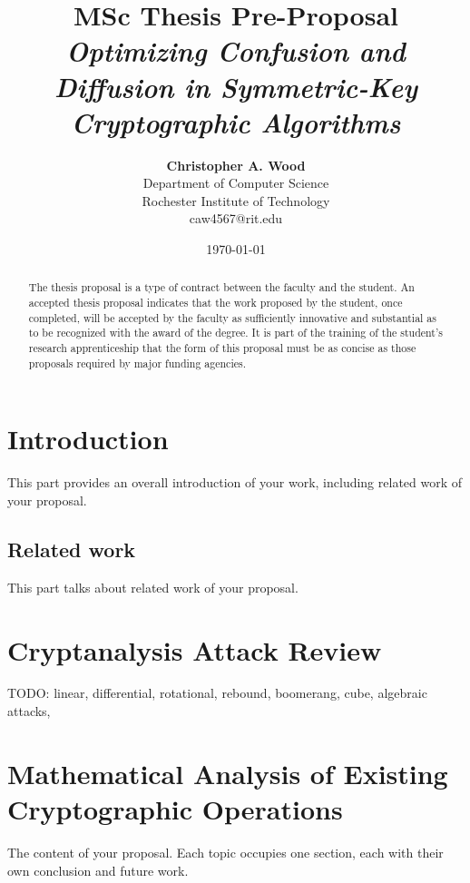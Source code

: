 \documentclass[12pt]{article}
\title{{\bf MSc Thesis Pre-Proposal} \\
\it Optimizing Confusion and Diffusion in Symmetric-Key Cryptographic Algorithms}
\author{ {\bf Christopher A. Wood}  \\
Department of Computer Science \\
Rochester Institute of Technology\\
{\small caw4567@rit.edu}
}
\date{\today}
\begin{document}
\pagestyle{plain}
\maketitle

\pagebreak
\begin{abstract}

The thesis proposal is a type of contract between the faculty and the student. 
An accepted thesis proposal indicates that the work proposed by the student, 
once completed, will be accepted by the faculty as sufficiently innovative and 
substantial as to be recognized with the award of the degree. It is part of 
the training of the student's research apprenticeship that the form of this 
proposal must be as concise as those proposals required by major funding 
agencies.

\end{abstract}

\pagebreak
\tableofcontents
\pagebreak

\cleardoublepage
{}

\section{Introduction}
\label{ch:intro}

This part provides an overall introduction of your work, including related work of your proposal.

\subsection{Related work}
\label{ch:related}

This part talks about related work of your proposal.

\section{Cryptanalysis Attack Review}
\label{ch:cryptanalysis}

TODO: linear, differential, rotational, rebound, boomerang, cube, algebraic attacks, 

\section{Mathematical Analysis of Existing Cryptographic Operations}
\label{ch:proposal}

The content of your proposal. Each topic occupies one section, each with their own conclusion and future work.
\end{document}
